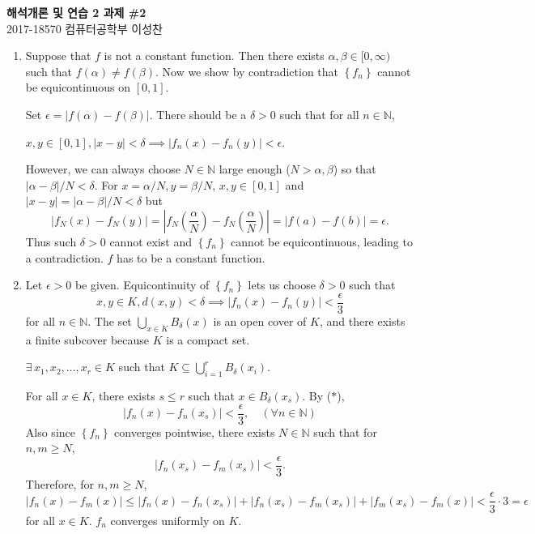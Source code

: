 \documentclass[12pt]{report}
\newcommand{\numl}[1]{\item[\large\textbf{\sffamily #1.}]}
\newcommand{\ds}{\displaystyle}
\renewcommand{\subset}{\subseteq}
\newcommand{\abs}[1]{\left| #1 \right|}
\newcommand{\seq}[1]{\left\{ #1 \right\}}
\newcommand{\mast}{\(\ast\)}
\newcommand{\N}{\mathbb{N}}
\let\oldexists\exists
\renewcommand{\exists}{\oldexists\,}
\begin{document}
\begin{center}
    \textbf{\Large 해석개론 및 연습 2 과제 \#2}\\
    \large 2017-18570 컴퓨터공학부 이성찬
\end{center}
\begin{enumerate}

    \numl{1} Suppose that \(f\) is not a constant function. Then there exists \(\alpha, \beta \in [0, \infty)\) such that \(f(\alpha) \neq f(\beta)\). Now we show by contradiction that \(\seq{f_n}\) cannot be equicontinuous on \([0, 1]\).

    Set \(\epsilon = \abs{f(\alpha) - f(\beta)}\). There should be a \(\delta > 0\) such that for all \(n \in \N\),
    \begin{center}
        \(x, y \in [0, 1], \abs{x - y} < \delta \implies \abs{f_n(x) - f_n(y)} < \epsilon\).
    \end{center}
    However, we can always choose \(N \in \N\) large enough (\(N > \alpha, \beta\)) so that \(\abs{\alpha - \beta}/N < \delta\).
    For \(x = \alpha/N, y = \beta/N\), \(x, y \in [0, 1]\) and \(\abs{x - y} = \abs{\alpha - \beta}/N < \delta\) but
    \[
        \abs{f_N(x) - f_N(y)} = \abs{f_N\left(\frac{\alpha}{N}\right) - f_N\left(\frac{\alpha}{N}\right)} = \abs{f(a) - f(b)} = \epsilon.
    \]
    Thus such \(\delta > 0\) cannot exist and \(\seq{f_n}\) cannot be equicontinuous, leading to a contradiction. \(f\) has to be a constant function.

    \numl{2} Let \(\epsilon > 0\) be given. Equicontinuity of \(\seq{f_n}\) lets us choose \(\delta > 0\) such that
    \[ \tag{\mast}
        x, y \in K, d(x, y) < \delta \implies \abs{f_n(x) - f_n(y)} < \frac{\epsilon}{3}
    \]
    for all \(n \in \N\). The set \(\ds \bigcup_{x\in K} B_\delta(x)\) is an open cover of \(K\), and there exists a finite subcover because \(K\) is a compact set.
    \begin{center}
        \(\exists x_1, x_2, \dots, x_r \in K\) such that \(\ds K \subset \bigcup_{i=1}^r B_\delta(x_i)\).
    \end{center}

    For all \(x \in K\), there exists \(s \leq r\) such that \(x \in B_\delta(x_s)\). By (\mast),
    \[
        \abs{f_n(x) - f_n(x_s)} < \frac{\epsilon}{3}, \quad (\forall n \in \N)
    \]
    Also since \(\seq{f_n}\) converges pointwise, there exists \(N\in \N\) such that for \(n, m \geq N\),
    \[
        \abs{f_n(x_s) - f_m(x_s)} < \frac{\epsilon}{3}.
    \]
    Therefore, for \(n, m \geq N\),
    \[
        \abs{f_n(x) - f_m(x)} \leq \abs{f_n(x) - f_n(x_s)} + \abs{f_n(x_s) - f_m(x_s)} + \abs{f_m(x_s) - f_m(x)} < \frac{\epsilon}{3} \cdot 3 = \epsilon
    \]
    for all \(x \in K\). \(f_n\) converges uniformly on \(K\).


\end{enumerate}
\end{document}
